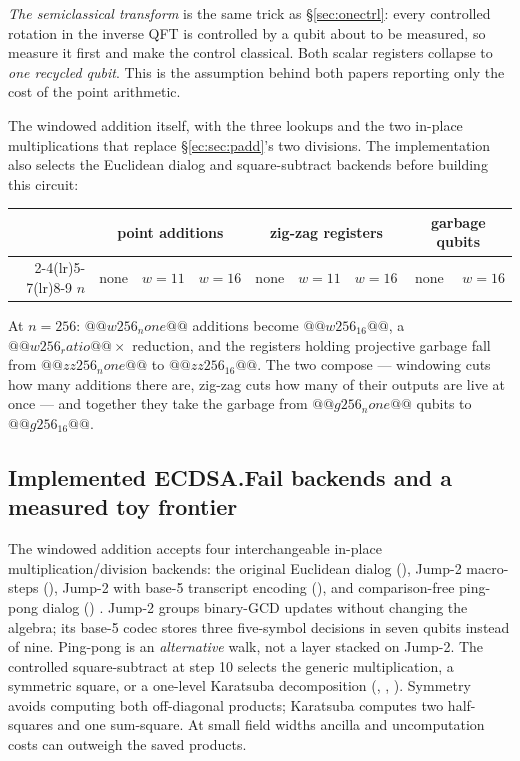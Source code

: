\emph{The semiclassical transform} \cite{ec:griffiths-niu} is the same trick as
\S\ref{sec:onectrl}: every controlled rotation in the inverse QFT is controlled by a qubit about to
be measured, so measure it first and make the control classical. Both scalar registers collapse to
\emph{one recycled qubit}. This is the assumption behind both papers reporting only the cost of the
point arithmetic.

The windowed addition itself, with the three lookups and the two in-place multiplications that
replace \S\ref{ec:sec:padd}'s two divisions. The implementation also selects the
Euclidean dialog and square-subtract backends before building this circuit:


\begin{center}\small
\begin{tabular}{@{}rrrrrrrrr@{}}
\toprule
& \multicolumn{3}{c}{point additions} & \multicolumn{3}{c}{zig-zag registers} & \multicolumn{2}{c}{garbage qubits}\\
\cmidrule(lr){2-4}\cmidrule(lr){5-7}\cmidrule(lr){8-9}
$n$ & none & $w{=}11$ & $w{=}16$ & none & $w{=}11$ & $w{=}16$ & none & $w{=}16$\\
\midrule
\bottomrule
\end{tabular}
\end{center}

\noindent
At $n=256$: $@@w256_none@@$ additions become $@@w256_16@@$, a $@@w256_ratio@@\times$ reduction,
and the registers holding projective garbage fall from $@@zz256_none@@$ to $@@zz256_16@@$. The two
compose --- windowing cuts how many additions there are, zig-zag cuts how many of their outputs are
live at once --- and together they take the garbage from $@@g256_none@@$ qubits to $@@g256_16@@$.

\subsection{Implemented ECDSA.Fail backends and a measured toy frontier}\label{ec:sec:pareto}

The windowed addition accepts four interchangeable in-place multiplication/division
backends: the original Euclidean dialog (), Jump-2 macro-steps
(), Jump-2 with base-5 transcript encoding
(), and comparison-free ping-pong dialog
() \cite{ec:ecdsafail26}. Jump-2 groups binary-GCD updates
without changing the algebra; its base-5 codec stores three five-symbol
decisions in seven qubits instead of nine. Ping-pong is an \emph{alternative}
walk, not a layer stacked on Jump-2. The controlled square-subtract at step 10
selects the generic multiplication, a symmetric square, or a one-level
Karatsuba decomposition (, ,
). Symmetry avoids computing both off-diagonal products;
Karatsuba computes two half-squares and one sum-square. At small field widths
ancilla and uncomputation costs can outweigh the saved products.

